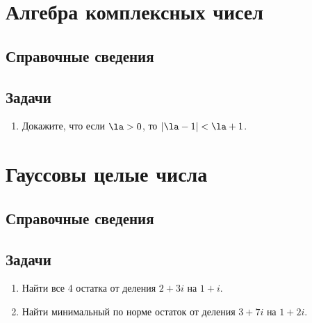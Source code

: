 \begin{comment}
\chapter{12. Комплексная арифметика и алгебра}
\end{comment}


\section{Алгебра комплексных чисел}

\subsection*{Справочные сведения}

\subsection*{Задачи}


\begin{enumerate}
\item Докажите, что если $\la>0$, то $|\la-1|<\la+1$.

\end{enumerate}


\section{Гауссовы целые числа}

\subsection*{Справочные сведения}

\subsection*{Задачи}

\begin{enumerate}
\item Найти все 4 остатка от деления $2+3i$ на $1+i$.
\item Найти минимальный по норме остаток от деления $3+7i$ на $1+2i$.
\end{enumerate}


\begin{comment}
\chapter{13. Введение в линейную алгебру}
\end{comment}
\label{linalg}


